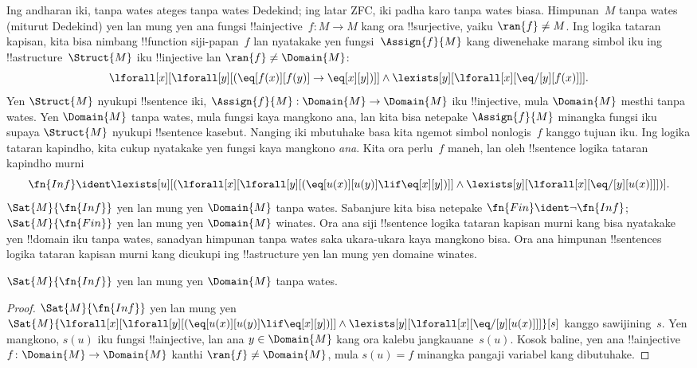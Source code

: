 \documentclass[../../../include/open-logic-section]{subfiles}
\begin{document}


Ing andharan iki, tanpa wates ateges tanpa wates Dedekind; ing latar ZFC, iki padha karo tanpa wates biasa.  Himpunan~$M$ tanpa wates (miturut Dedekind) yen lan mung yen
ana fungsi !!a{injective}~$f\colon M \to M$ kang ora
!!{surjective}, yaiku $\ran{f} \neq M$. Ing logika tataran
kapisan, kita bisa nimbang !!{function} siji-papan~$f$
lan nyatakake yen fungsi~$\Assign{f}{M}$ kang diwenehake
marang simbol iku ing !!a{structure}~$\Struct{M}$ iku
!!{injective} lan $\ran{f} \neq \Domain{M}$:
\[
\lforall[x][\lforall[y][(\eq[f(x)][f(y)] \to \eq[x][y])]] \land
\lexists[y][\lforall[x][\eq/[y][f(x)]]].
\]
Yen $\Struct{M}$ nyukupi !!{sentence} iki,
$\Assign{f}{M}: \Domain{M} \to \Domain{M}$ iku
!!{injective}, mula $\Domain{M}$ mesthi tanpa wates. Yen
$\Domain{M}$ tanpa wates, mula fungsi kaya mangkono ana,
lan kita bisa netepake $\Assign{f}{M}$ minangka fungsi
iku supaya $\Struct{M}$ nyukupi !!{sentence} kasebut.
Nanging iki mbutuhake basa kita ngemot simbol nonlogis~$f$
kanggo tujuan iku. Ing logika tataran kapindho, kita cukup
nyatakake yen fungsi kaya mangkono \emph{ana}. Kita ora
perlu~$f$ maneh, lan oleh !!{sentence} logika tataran
kapindho murni
\[
\fn{Inf} \ident \lexists[u][(\lforall[x][\lforall[y][(\eq[u(x)][u(y)]
      \lif \eq[x][y])]] \land \lexists[y][\lforall[x][\eq/[y][u(x)]]])].
\]
$\Sat{M}{\fn{Inf}}$ yen lan mung yen $\Domain{M}$ tanpa
wates. Sabanjure kita bisa netepake
$\fn{Fin} \ident \lnot \fn{Inf}$;
$\Sat{M}{\fn{Fin}}$ yen lan mung yen $\Domain{M}$ winates.
Ora ana siji !!{sentence} logika tataran kapisan murni kang bisa
nyatakake yen !!{domain} iku tanpa wates, sanadyan himpunan
tanpa wates saka ukara-ukara kaya mangkono bisa. Ora ana
himpunan !!{sentence}s logika tataran kapisan murni kang dicukupi
ing !!a{structure} yen lan mung yen domaine winates.

\begin{prop}
$\Sat{M}{\fn{Inf}}$ yen lan mung yen $\Domain{M}$ tanpa wates.
\end{prop}

\begin{proof}
$\Sat{M}{\fn{Inf}}$ yen lan mung yen
  $\Sat{M}{\lforall[x][\lforall[y][(\eq[u(x)][u(y)] \lif \eq[x][y])]]
    \land \lexists[y][\lforall[x][\eq/[y][u(x)]]]}[s]$
  kanggo sawijining~$s$. Yen mangkono, $s(u)$ iku fungsi
  !!a{injective}, lan ana $y \in \Domain{M}$ kang ora
  kalebu jangkauane~$s(u)$. Kosok baline, yen ana
  !!a{injective} $f\colon \Domain{M} \to \Domain{M}$
  kanthi $\ran{f} \neq \Domain{M}$, mula $s(u) = f$
  minangka pangaji variabel kang dibutuhake.
\end{proof}
\end{document}
